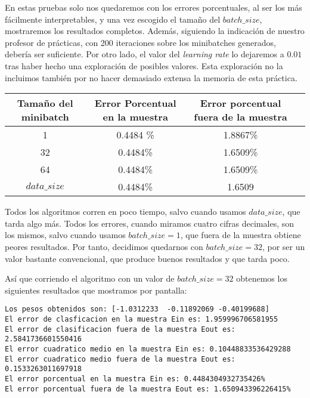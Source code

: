 \documentclass[11pt]{article}
\begin{document}
En estas pruebas solo nos quedaremos con los errores porcentuales, al ser los más fácilmente interpretables, y una vez escogido el tamaño del $batch\_size$, mostraremos los resultados completos. Además, siguiendo la indicación de nuestro profesor de prácticas, con 200 iteraciones sobre los minibatches generados, debería ser suficiente. Por otro lado, el valor del \emph{learning rate} lo dejaremos a $0.01$ tras haber hecho una exploración de posibles valores. Esta exploración no la incluimos también por no hacer demasiado extensa la memoria de esta práctica.

\begin{center}
    \begin{tabular}{| c | c | c | c |}
        Tamaño del minibatch & Error Porcentual en la muestra & Error porcentual fuera de la muestra \\
        \hline
        1 & 0.4484 \% & 1.8867\% \\
        32 & 0.4484\% & 1.6509\% \\
        64 & 0.4484\% & 1.6509\% \\
        $data\_size$ & 0.4484\% & 1.6509 \\
        \hline
    \end{tabular}
\end{center}

Todos los algoritmos corren en poco tiempo, salvo cuando usamos $data\_size$, que tarda algo más. Todos los errores, cuando miramos cuatro cifras decimales, son los mismos, salvo cuando usamos $batch\_size = 1$, que fuera de la muestra obtiene peores resultados. Por tanto, decidimos quedarnos con $batch\_size = 32$, por ser un valor bastante convencional, que produce buenos resultados y que tarda poco.

Así que corriendo el algoritmo con un valor de $batch\_size = 32$ obtenemos los siguientes resultados que mostramos por pantalla:

\begin{lstlisting}
Los pesos obtenidos son: [-1.0312233  -0.11892069 -0.40199688]
El error de clasficacion en la muestra Ein es: 1.959996706581955
El error de clasificacion fuera de la muestra Eout es: 2.5841736601550416
El error cuadratico medio en la muestra Ein es: 0.10448833536429288
El error cuadratico medio fuera de la muestra Eout es: 0.1533263011697918
El error porcentual en la muestra Ein es: 0.4484304932735426%
El error porcentual fuera de la muestra Eout es: 1.650943396226415%
\end{lstlisting}
\end{document}
